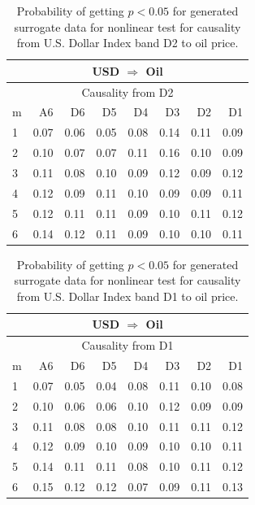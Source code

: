 %
%
\begin{table}[H]
\begin{center}
\begin{tabular}{l|r r r r r r r}
\hline\hline
\multicolumn{8}{c}{USD $\Rightarrow$ Oil}\\
\hline
\multicolumn{8}{c}{Causality from D2}\\
\hline\hline
m & A6 & D6 & D5 & D4 & D3 & D2 & D1 \\
\hline
1 & 0.07 & 0.06 & 0.05 & 0.08 & 0.14 & 0.11 & 0.09 \\
2 & 0.10 & 0.07 & 0.07 & 0.11 & \cellcolor{mygrey}0.16 & 0.10 & 0.09 \\
3 & 0.11 & 0.08 & 0.10 & 0.09 & 0.12 & 0.09 & 0.12 \\
4 & 0.12 & 0.09 & 0.11 & 0.10 & 0.09 & 0.09 & 0.11 \\
5 & 0.12 & 0.11 & 0.11 & 0.09 & 0.10 & 0.11 & 0.12 \\
6 & 0.14 & 0.12 & 0.11 & 0.09 & 0.10 & 0.10 & 0.11 \\
\hline\hline
\end{tabular}
\caption{Probability of getting $p < 0.05$ for generated surrogate data for nonlinear test for causality from U.S. Dollar Index band D2 to oil price.}
\end{center}
\end{table}

%
%
\begin{table}[H]
\begin{center}
\begin{tabular}{l|r r r r r r r}
\hline\hline
\multicolumn{8}{c}{USD $\Rightarrow$ Oil}\\
\hline
\multicolumn{8}{c}{Causality from D1}\\
\hline\hline
m & A6 & D6 & D5 & D4 & D3 & D2 & D1 \\
\hline
1 & 0.07 & 0.05 & 0.04 & 0.08 & 0.11 & 0.10 & 0.08 \\
2 & \cellcolor{mygrey}0.10 & 0.06 & 0.06 & 0.10 & 0.12 & 0.09 & 0.09 \\
3 & 0.11 & 0.08 & 0.08 & 0.10 & 0.11 & 0.11 & 0.12 \\
4 & 0.12 & 0.09 & 0.10 & 0.09 & 0.10 & 0.10 & 0.11 \\
5 & 0.14 & 0.11 & 0.11 & \cellcolor{mygreen}0.08 & 0.10 & 0.11 & 0.12 \\
6 & 0.15 & 0.12 & 0.12 & \cellcolor{mygreen}0.07 & 0.09 & 0.11 & 0.13 \\
\hline\hline
\end{tabular}
\caption{Probability of getting $p < 0.05$ for generated surrogate data for nonlinear test for causality from U.S. Dollar Index band D1 to oil price.}
\end{center}
\end{table}

